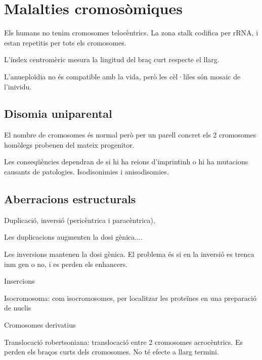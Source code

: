 
\section{Malalties cromosòmiques}
\label{sec:malalt-crom}

Els humans no tenim cromosomes telocèntrics. La zona stalk codifica per rRNA, i estan repetitis per tots els cromosomes.

L'índex centromèric mesura la lingitud del braç curt respecte el llarg.

L'anueploïdia no és compatible amb la vida, però les cèl·liles són mosaic de l'inividu.


\subsection{Disomia uniparental}
\label{sec:disomia-uniparental}

El nombre de cromosomes és normal però per un parell concret els 2 cromosomes homòlegs probenen del mateix progenitor.

Les conseqüències dependran de si hi ha reions d'imprintinh o hi ha mutacions causants de patologies. Isodisonimies i anisodisomies.


\subsection{Aberracions estructurals}
\label{sec:aberr-estr}

Duplicació, inversió (pericèntrica i paracèntrica), 

Les duplicacions augmenten la dosi gènica....

Les inversions mantenen la dosi gènica. El problema és si en la inversió es trenca inm gen o no, i es perden els enhancers.

Insercions

Isocromosoma:  com isocromosomes, per localitzar les proteïnes en una preparació de nuclis

Cromosomes derivatius

Translocació robertsoniana: translocació entre 2 cromosomes acrocèntrics. Es perden els braços curts dels cromosomes. No té efecte a llarg termini.

